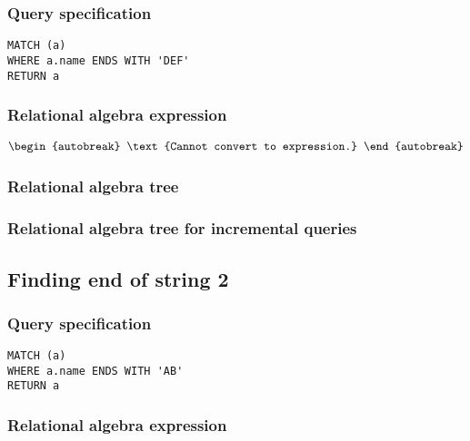 \subsubsection*{Query specification}

\begin{lstlisting}
MATCH (a)
WHERE a.name ENDS WITH 'DEF'
RETURN a
\end{lstlisting}

\subsubsection*{Relational algebra expression}

\begin{align*}
\begin{autobreak}
\text{Cannot convert to expression.}
\end{autobreak}
\end{align*}

\subsubsection*{Relational algebra tree}


\subsubsection*{Relational algebra tree for incremental queries}


\subsection{Finding end of string 2}

\subsubsection*{Query specification}

\begin{lstlisting}
MATCH (a)
WHERE a.name ENDS WITH 'AB'
RETURN a
\end{lstlisting}

\subsubsection*{Relational algebra expression}

